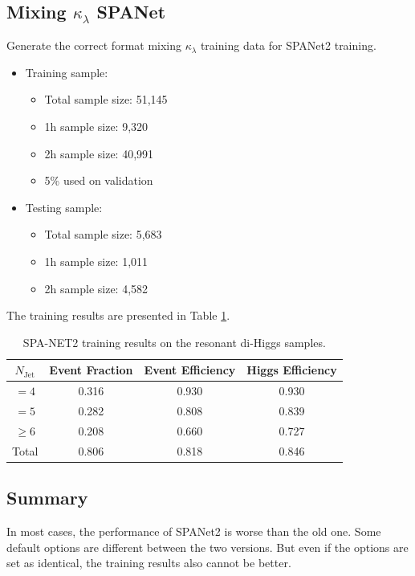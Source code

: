 \documentclass[12pt]{article}
\begin{document}
	\subsection{Mixing \texorpdfstring{$\kappa_\lambda$}{kappa} SPANet}%
	\label{sub:mixing_kappa_spanet}
		Generate the correct format mixing $\kappa_\lambda$ training data for SPANet2 training.
		\begin{itemize}
			\item Training sample:
			\begin{itemize}
				\item Total sample size: 51,145
				\item 1h sample size: 9,320
				\item 2h sample size: 40,991
				\item 5\% used on validation
			\end{itemize}
			\item Testing sample:
			\begin{itemize}
				\item Total sample size: 5,683
				\item 1h sample size: 1,011
				\item 2h sample size: 4,582
			\end{itemize}
		\end{itemize}
		The training results are presented in Table \ref{tab:SPANet2_diHiggs_4btag_DL1r_pt40_mix}.
		\begin{table}[htpb]
			\centering
			\caption{SPA-NET2 training results on the resonant di-Higgs samples.}
			\label{tab:SPANet2_diHiggs_4btag_DL1r_pt40_mix}
			\begin{tabular}{c|c|cc}
				$N_\text{Jet}$ & Event Fraction & Event Efficiency & Higgs Efficiency \\
				\hline
				$=4$	  &   0.316             &    0.930              &    0.930             \\
				$=5$	  &   0.282             &    0.808              &    0.839             \\
				$\ge 6$	  &   0.208             &    0.660              &    0.727             \\
				Total	  &   0.806             &    0.818              &    0.846             \\
			\end{tabular}
		\end{table}

		
	\subsection{Summary}%
	\label{sub:summary}
		In most cases, the performance of SPANet2 is worse than the old one. Some default options are different between the two versions. But even if the options are set as identical, the training results also cannot be better.
\end{document}
